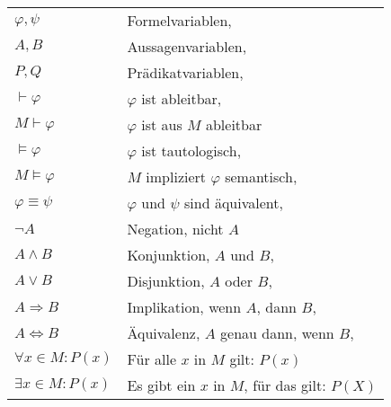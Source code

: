 \\
\begin{tabular}{@{}l@{\enspace}l}
$\varphi,\psi$ & Formelvariablen, \pageref{def:Interpretation}\\
$A,B$ & Aussagenvariablen, \pageref{subsec:Aussagenlogik}\\
$P,Q$ & Prädikatvariablen, \pageref{subsec:Praedikatenlogik}\\
$\vdash\varphi$ & $\varphi$ ist ableitbar,
\pageref{eq:Ableitungsrelation}\\
$M\vdash\varphi$ & $\varphi$ ist aus $M$ ableitbar\\
$\models\varphi$ & $\varphi$ ist tautologisch,
\pageref{eq:tautologisch}\\
$M\models\varphi$ & $M$ impliziert $\varphi$ semantisch,
\pageref{eq:semantische-Implikation}\\
$\varphi\equiv\psi$ & $\varphi$ und $\psi$ sind äquivalent,
\pageref{eq:aequivalente-Formeln}\\
$\neg A$ & Negation, nicht $A$\\
$A\land B$ & Konjunktion, $A$ und $B$, \pageref{tab:Wahrheitstafel}\\
$A\lor B$ & Disjunktion, $A$ oder $B$, \pageref{tab:Wahrheitstafel}\\
$A\Rightarrow B$ & Implikation, wenn $A$, dann $B$, \pageref{tab:Wahrheitstafel}\\
$A\Leftrightarrow B$ & Äquivalenz, $A$ genau dann, wenn $B$, \pageref{tab:Wahrheitstafel}\\
$\forall x{\in}M\colon P(x)$ & Für alle $x$ in $M$ gilt: $P(x)$\\
$\exists x{\in}M\colon P(x)$ & Es gibt ein $x$ in $M$, für das gilt: $P(X)$
\end{tabular}

